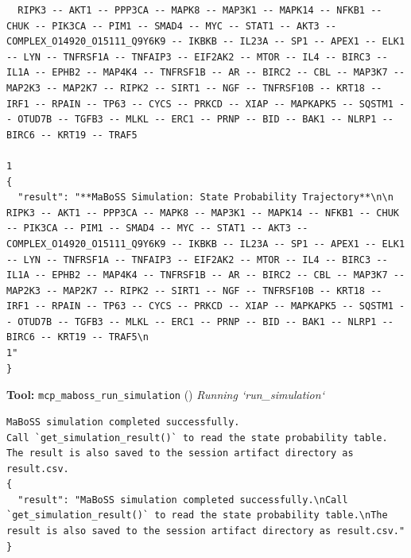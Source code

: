 \documentclass[11pt,a4paper]{article}
\begin{document}
\begin{toolokbox}
\begin{lstlisting}
  RIPK3 -- AKT1 -- PPP3CA -- MAPK8 -- MAP3K1 -- MAPK14 -- NFKB1 -- CHUK -- PIK3CA -- PIM1 -- SMAD4 -- MYC -- STAT1 -- AKT3 -- COMPLEX_O14920_O15111_Q9Y6K9 -- IKBKB -- IL23A -- SP1 -- APEX1 -- ELK1 -- LYN -- TNFRSF1A -- TNFAIP3 -- EIF2AK2 -- MTOR -- IL4 -- BIRC3 -- IL1A -- EPHB2 -- MAP4K4 -- TNFRSF1B -- AR -- BIRC2 -- CBL -- MAP3K7 -- MAP2K3 -- MAP2K7 -- RIPK2 -- SIRT1 -- NGF -- TNFRSF10B -- KRT18 -- IRF1 -- RPAIN -- TP63 -- CYCS -- PRKCD -- XIAP -- MAPKAPK5 -- SQSTM1 -- OTUD7B -- TGFB3 -- MLKL -- ERC1 -- PRNP -- BID -- BAK1 -- NLRP1 -- BIRC6 -- KRT19 -- TRAF5
                                                                                                                                                                                                                                                                                                                                                                                                                                                                                                                                                                                    1
{
  "result": "**MaBoSS Simulation: State Probability Trajectory**\n\n  RIPK3 -- AKT1 -- PPP3CA -- MAPK8 -- MAP3K1 -- MAPK14 -- NFKB1 -- CHUK -- PIK3CA -- PIM1 -- SMAD4 -- MYC -- STAT1 -- AKT3 -- COMPLEX_O14920_O15111_Q9Y6K9 -- IKBKB -- IL23A -- SP1 -- APEX1 -- ELK1 -- LYN -- TNFRSF1A -- TNFAIP3 -- EIF2AK2 -- MTOR -- IL4 -- BIRC3 -- IL1A -- EPHB2 -- MAP4K4 -- TNFRSF1B -- AR -- BIRC2 -- CBL -- MAP3K7 -- MAP2K3 -- MAP2K7 -- RIPK2 -- SIRT1 -- NGF -- TNFRSF10B -- KRT18 -- IRF1 -- RPAIN -- TP63 -- CYCS -- PRKCD -- XIAP -- MAPKAPK5 -- SQSTM1 -- OTUD7B -- TGFB3 -- MLKL -- ERC1 -- PRNP -- BID -- BAK1 -- NLRP1 -- BIRC6 -- KRT19 -- TRAF5\n                                                                                                                                                                                                                                                                                                                                                                                                                                                                                                                                                                                    1"
}
\end{lstlisting}
\end{toolokbox}
\begin{toolokbox}
\textbf{Tool:} \texttt{mcp\_maboss\_run\_simulation} (\checkmark)
\textit{Running `run\_simulation`}
\begin{lstlisting}
MaBoSS simulation completed successfully.
Call `get_simulation_result()` to read the state probability table.
The result is also saved to the session artifact directory as result.csv.
{
  "result": "MaBoSS simulation completed successfully.\nCall `get_simulation_result()` to read the state probability table.\nThe result is also saved to the session artifact directory as result.csv."
}
\end{lstlisting}
\end{toolokbox}
\end{document}
